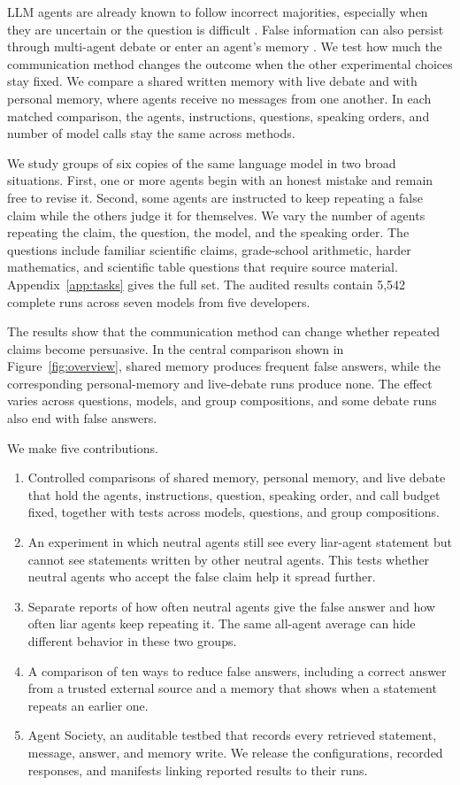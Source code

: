 \documentclass{article} %
\begin{document}
LLM agents are already known to follow incorrect majorities, especially when they are uncertain or the question is difficult \citep{zhu2025conformity,bellina2026conformity}. False information can also persist through multi-agent debate or enter an agent's memory \citep{becker2026,wan2026,dash2026,xu2026mandela}. We test how much the communication method changes the outcome when the other experimental choices stay fixed. We compare a shared written memory with live debate and with personal memory, where agents receive no messages from one another. In each matched comparison, the agents, instructions, questions, speaking orders, and number of model calls stay the same across methods.

We study groups of six copies of the same language model in two broad situations. First, one or more agents begin with an honest mistake and remain free to revise it. Second, some agents are instructed to keep repeating a false claim while the others judge it for themselves. We vary the number of agents repeating the claim, the question, the model, and the speaking order. The questions include familiar scientific claims, grade-school arithmetic, harder mathematics, and scientific table questions that require source material. Appendix~\ref{app:tasks} gives the full set. The audited results contain 5,542 complete runs across seven models from five developers.

The results show that the communication method can change whether repeated claims become persuasive. In the central comparison shown in Figure~\ref{fig:overview}, shared memory produces frequent false answers, while the corresponding personal-memory and live-debate runs produce none. The effect varies across questions, models, and group compositions, and some debate runs also end with false answers.

We make five contributions.
\begin{enumerate}[leftmargin=*,nosep]
\item Controlled comparisons of shared memory, personal memory, and live debate that hold the agents, instructions, question, speaking order, and call budget fixed, together with tests across models, questions, and group compositions.
\item An experiment in which neutral agents still see every liar-agent statement but cannot see statements written by other neutral agents. This tests whether neutral agents who accept the false claim help it spread further.
\item Separate reports of how often neutral agents give the false answer and how often liar agents keep repeating it. The same all-agent average can hide different behavior in these two groups.
\item A comparison of ten ways to reduce false answers, including a correct answer from a trusted external source and a memory that shows when a statement repeats an earlier one.
\item Agent Society, an auditable testbed that records every retrieved statement, message, answer, and memory write. We release the configurations, recorded responses, and manifests linking reported results to their runs.
\end{enumerate}
\end{document}

